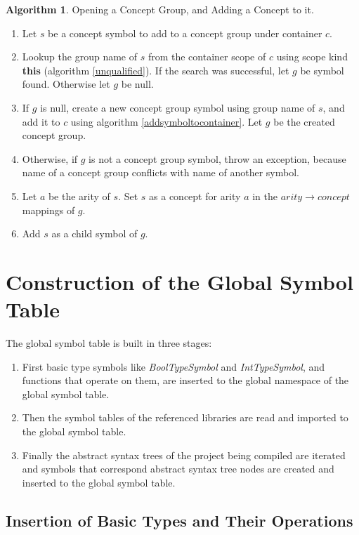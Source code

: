\documentclass[a4paper,oneside,11pt]{book}
\theoremstyle{definition}
\newtheorem{algo}{Algorithm}[section]
\begin{document}
\begin{algo}\label{addtoconceptgroup} Opening a Concept Group, and Adding a Concept to it.
\begin{enumerate}
\item
Let $s$ be a concept symbol to add to a concept group under container $c$.
\item
Lookup the group name of $s$ from the container scope of $c$ using scope kind \textbf{this} (algorithm \ref{unqualified}).
If the search was successful, let $g$ be symbol found. Otherwise let $g$ be null.
\item
If $g$ is null, create a new concept group symbol using group name of $s$, and add it to $c$ using
algorithm \ref{addsymboltocontainer}. Let $g$ be the created concept group.
\item
Otherwise, if $g$ is not a concept group symbol, throw an exception, because name of a concept group
conflicts with name of another symbol.
\item
Let $a$ be the arity of $s$. Set $s$ as a concept for arity $a$ in the $arity \rightarrow concept$ mappings of $g$.
\item
Add $s$ as a child symbol of $g$.
\end{enumerate}
\end{algo}

\section{Construction of the Global Symbol Table}

The global symbol table is built in three stages:

\begin{enumerate}
\item
First basic type symbols like \emph{BoolTypeSymbol} and \emph{IntTypeSymbol}, and functions that operate on them,
are inserted to the global namespace of the global symbol table.

\item
Then the symbol tables of the referenced libraries are read and imported to the global symbol table.

\item
Finally the abstract syntax trees of the project being compiled are iterated
and symbols that correspond abstract syntax tree nodes are created and inserted to the global symbol table.
\end{enumerate}

\subsection{Insertion of Basic Types and Their Operations}
\end{document}
